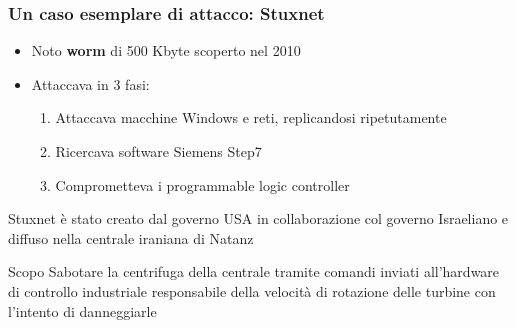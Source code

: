 \begin{frame}
  \frametitle{Un caso esemplare di attacco: Stuxnet}
  \begin{itemize}[<+- | alert@+>]
  	\item Noto \textbf{\color{blue_slides}worm} di 500 Kbyte scoperto nel 2010 %
  	\item Attaccava in 3 fasi:
  	\begin{enumerate}[<+- | alert@+>]
  		\item Attaccava macchine Windows e reti, replicandosi ripetutamente
  		\item Ricercava software Siemens Step7 %
  		\item Comprometteva i programmable logic controller
  	\end{enumerate}
  \end{itemize}
  \pause
  \begin{block}{}
  Stuxnet è stato creato dal governo USA in collaborazione col governo Israeliano e diffuso nella centrale iraniana di Natanz
  \end{block}
  \pause
   \begin{block}{Scopo}
   	Sabotare la centrifuga della centrale tramite comandi inviati all’hardware di controllo industriale responsabile della velocità di rotazione delle turbine con l'intento di danneggiarle
   \end{block}
\end{frame}

